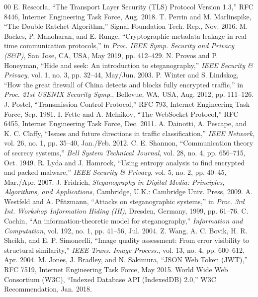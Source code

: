 \documentclass[conference]{IEEEtran}
\begin{document}
\begin{thebibliography}{00}
 E. Rescorla, ``The Transport Layer Security (TLS) Protocol Version 1.3,'' RFC 8446, Internet Engineering Task Force, Aug. 2018.
 T. Perrin and M. Marlinspike, ``The Double Ratchet Algorithm,'' Signal Foundation Tech. Rep., Nov. 2016.
 M. Backes, P. Manoharan, and E. Runge, ``Cryptographic metadata leakage in real-time communication protocols,'' in \textit{Proc. IEEE Symp. Security and Privacy (S\&P)}, San Jose, CA, USA, May 2019, pp. 412--429.
 N. Provos and P. Honeyman, ``Hide and seek: An introduction to steganography,'' \textit{IEEE Security \& Privacy}, vol. 1, no. 3, pp. 32--44, May/Jun. 2003.
 P. Winter and S. Lindskog, ``How the great firewall of China detects and blocks fully encrypted traffic,'' in \textit{Proc. 21st USENIX Security Symp.}, Bellevue, WA, USA, Aug. 2012, pp. 111--126.
 J. Postel, ``Transmission Control Protocol,'' RFC 793, Internet Engineering Task Force, Sep. 1981.
 I. Fette and A. Melnikov, ``The WebSocket Protocol,'' RFC 6455, Internet Engineering Task Force, Dec. 2011.
 A. Dainotti, A. Pescape, and K. C. Claffy, ``Issues and future directions in traffic classification,'' \textit{IEEE Network}, vol. 26, no. 1, pp. 35--40, Jan./Feb. 2012.
 C. E. Shannon, ``Communication theory of secrecy systems,'' \textit{Bell System Technical Journal}, vol. 28, no. 4, pp. 656--715, Oct. 1949.
 R. Lyda and J. Hamrock, ``Using entropy analysis to find encrypted and packed malware,'' \textit{IEEE Security \& Privacy}, vol. 5, no. 2, pp. 40--45, Mar./Apr. 2007.
 J. Fridrich, \textit{Steganography in Digital Media: Principles, Algorithms, and Applications}, Cambridge, U.K.: Cambridge Univ. Press, 2009.
 A. Westfeld and A. Pfitzmann, ``Attacks on steganographic systems,'' in \textit{Proc. 3rd Int. Workshop Information Hiding (IH)}, Dresden, Germany, 1999, pp. 61--76.
 C. Cachin, ``An information-theoretic model for steganography,'' \textit{Information and Computation}, vol. 192, no. 1, pp. 41--56, Jul. 2004.
 Z. Wang, A. C. Bovik, H. R. Sheikh, and E. P. Simoncelli, ``Image quality assessment: From error visibility to structural similarity,'' \textit{IEEE Trans. Image Process.}, vol. 13, no. 4, pp. 600--612, Apr. 2004.
 M. Jones, J. Bradley, and N. Sakimura, ``JSON Web Token (JWT),'' RFC 7519, Internet Engineering Task Force, May 2015.
 World Wide Web Consortium (W3C), ``Indexed Database API (IndexedDB) 2.0,'' W3C Recommendation, Jan. 2018.
\end{thebibliography}
\end{document}
